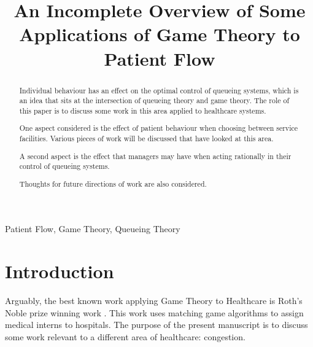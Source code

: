 \documentclass[a4paper,11pt]{article}
\title{An Incomplete Overview of Some Applications of Game Theory to Patient Flow}
\begin{document}
\maketitle

\author{
}

\author{
}

\author{
}

\author{
}

\author{
}

\vspace{8mm}

\begin{abstract}

Individual behaviour has an effect on the optimal control of queueing systems, which is an idea that sits at the intersection of queueing theory and game theory.
The role of this paper is to discuss some work in this area applied to healthcare systems.

One aspect considered is the effect of patient behaviour when choosing between service facilities.
Various pieces of work will be discussed that have looked at this area.

A second aspect is the effect that managers may have when acting rationally in their control of queueing systems.

Thoughts for future directions of work are also considered.
\end{abstract}

\bigskip
\begin{keywords}
Patient Flow, Game Theory, Queueing Theory

\bigskip
{}
\end{keywords}


\newpage

\section{Introduction}

Arguably, the best known work applying Game Theory to Healthcare is Roth's Noble prize winning work \cite{roth_redesign_1999}.
This work uses matching game algorithms to assign medical interns to hospitals.
The purpose of the present manuscript is to discuss some work relevant to a different area of healthcare: congestion.
\end{document}
